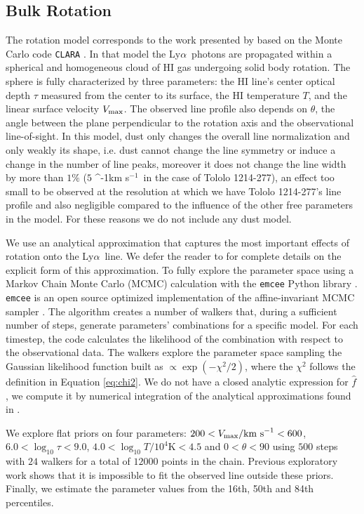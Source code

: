 \documentclass[a4paper,fleqn,usenatbib]{mnras}
\newcommand{\tol}{Tololo 1214-277}
\newcommand{\lya}{\ifmmode{{\rm Ly}\alpha}\else Ly$\alpha$\ \fi}
\newcommand{\kms}{\ifmmode\mathrm{km\ s}^{-1}\else km s$^{-1}$\fi}
\begin{document}
\subsection{Bulk Rotation}

The rotation model corresponds to the work presented by
\cite{GaravitoCamargo2014} based on the Monte Carlo code
\texttt{CLARA} \citep{CLARA}. 
In that model the \lya photons are propagated 
within a spherical and homogeneous cloud of HI gas undergoing solid
body rotation.
The sphere is fully characterized by three parameters: the HI line's
center optical  depth $\tau$ measured from the center to its surface, the HI
temperature $T$, and the linear surface velocity $V_{\rm max}$.  
The observed line profile also depends on $\theta$,  the angle between the plane
perpendicular to the rotation axis and the observational
line-of-sight.  
In this model, dust only changes the overall line
normalization and only weakly its shape, i.e. 
dust cannot change the line symmetry or induce a change in the number
of line peaks, moreover it does not change the line width by more than
$1\%$ ($5$ \kms\ in the case of \tol), an effect too small to be
observed at the resolution at which we have \tol's line profile and
also negligible compared to the influence of the other free parameters in the model.
For these reasons we do not include any dust model. 

We use an analytical approximation that captures the most important
effects of rotation onto the \lya line. 
We defer the reader to \citet{GaravitoCamargo2014} for complete
details on the explicit form of this approximation.
To fully explore the
parameter space using a Markov Chain Monte Carlo (MCMC) calculation with the
\texttt{emcee} Python library \citep{2013PASP..125..306F}. \texttt{emcee} 
is an open source optimized implementation of the affine-invariant 
MCMC sampler \citep{goodman2010ensemble}. 
The algorithm creates a number of walkers that,
during a sufficient number of steps, generate parameters' combinations
for a specific model.
For each timestep, the code calculates the likelihood of the
combination with respect to the observational data.
The walkers explore the parameter space sampling the Gaussian likelihood
function built as $\propto \exp(-\chi^2/2)$, where the $\chi^2$ follows
the definition in Equation \ref{eq:chi2}. 
We do not have a closed analytic expression for $\hat{f}$, we compute it
by numerical integration of the analytical approximations found in
\citet{GaravitoCamargo2014}.  

We explore flat priors on four parameters: $200<V_{\rm
  max}/\mathrm{km\ s}^{-1} <600$,   $6.0<\log_{10}\tau<9.0$,
$4.0<\log_{10} T/10^4\mathrm{K}< 4.5$ and $0<\theta<90$ using $500$
steps with $24$ walkers for a total of $12000$ points in the chain.
Previous exploratory work shows that it is impossible to fit the
observed line outside these priors.
Finally, we estimate the parameter values from the 16th, 50th and 84th
percentiles. 
\end{document}
